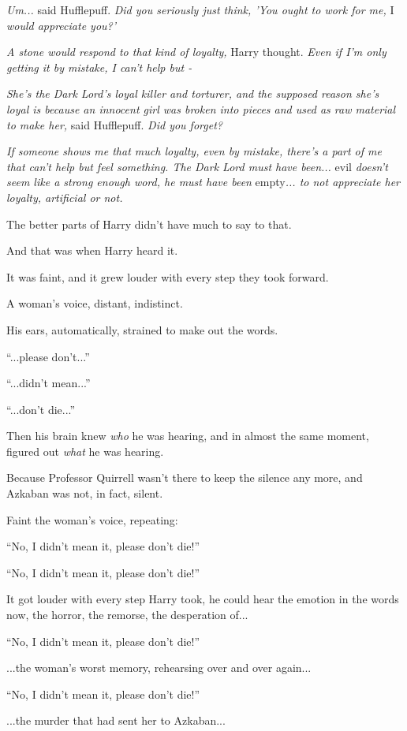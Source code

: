\emph{Um...} said Hufflepuff. \emph{Did you seriously just think,
'You ought to work for me,} I \emph{would appreciate you?'}

\emph{A stone would respond to that kind of loyalty,} Harry thought.
\emph{Even if I'm only getting it by mistake, I can't help but -}

\emph{She's the Dark Lord's loyal killer and torturer, and the supposed
reason she's loyal is because an innocent girl was broken into pieces
and used as raw material to make her,} said Hufflepuff. \emph{Did you
forget?}

\emph{If someone shows me that much loyalty, even by mistake, there's a
part of me that can't help but feel something. The Dark Lord must have
been...} evil \emph{doesn't seem like a strong enough word, he must
have been} empty\emph{... to not appreciate her loyalty, artificial
or not.}

The better parts of Harry didn't have much to say to that.

And that was when Harry heard it.

It was faint, and it grew louder with every step they took forward.

A woman's voice, distant, indistinct.

His ears, automatically, strained to make out the words.

``...please don't...''

``...didn't mean...''

``...don't die...''

Then his brain knew \emph{who} he was hearing, and in almost the same
moment, figured out \emph{what} he was hearing.

Because Professor Quirrell wasn't there to keep the silence any more,
and Azkaban was not, in fact, silent.

Faint the woman's voice, repeating:

``No, I didn't mean it, please don't die!''

``No, I didn't mean it, please don't die!''

It got louder with every step Harry took, he could hear the emotion in
the words now, the horror, the remorse, the desperation of...

``No, I didn't mean it, please don't die!''

...the woman's worst memory, rehearsing over and over again...

``No, I didn't mean it, please don't die!''

...the murder that had sent her to Azkaban...

